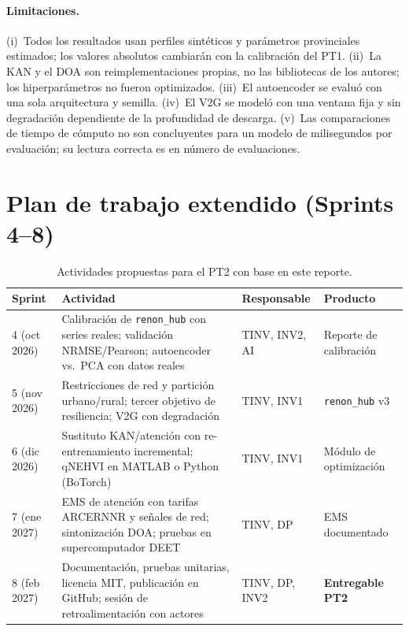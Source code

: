 \documentclass[11pt,a4paper]{article}
\begin{document}
\paragraph{Limitaciones.} (i)~Todos los resultados usan perfiles sint\'eticos y
par\'ametros provinciales estimados; los valores absolutos cambiar\'an con la
calibraci\'on del PT1. (ii)~La KAN y el DOA son reimplementaciones propias, no las
bibliotecas de los autores; los hiperpar\'ametros no fueron optimizados. (iii)~El
autoencoder se evalu\'o con una sola arquitectura y semilla. (iv)~El V2G se model\'o con
una ventana fija y sin degradaci\'on dependiente de la profundidad de descarga.
(v)~Las comparaciones de tiempo de c\'omputo no son concluyentes para un modelo de
milisegundos por evaluaci\'on; su lectura correcta es en n\'umero de evaluaciones.

\section{Plan de trabajo extendido (Sprints 4--8)}
\begin{table}[htbp]
\centering\small
\caption{Actividades propuestas para el PT2 con base en este reporte.}
\label{tab:plan}
\begin{tabular}{p{1.9cm}p{7.2cm}p{2.2cm}p{2.6cm}}
\toprule
\textbf{Sprint} & \textbf{Actividad} & \textbf{Responsable} & \textbf{Producto} \\
\midrule
4 (oct 2026) & Calibraci\'on de \texttt{renon\_hub} con series reales; validaci\'on NRMSE/Pearson; autoencoder vs.\ PCA con datos reales & TINV, INV2, AI & Reporte de calibraci\'on \\
5 (nov 2026) & Restricciones de red y partici\'on urbano/rural; tercer objetivo de resiliencia; V2G con degradaci\'on & TINV, INV1 & \texttt{renon\_hub} v3 \\
6 (dic 2026) & Sustituto KAN/atenci\'on con re-entrenamiento incremental; qNEHVI en MATLAB o Python (BoTorch) & TINV, INV1 & M\'odulo de optimizaci\'on \\
7 (ene 2027) & EMS de atenci\'on con tarifas ARCERNNR y se\~nales de red; sintonizaci\'on DOA; pruebas en supercomputador DEET & TINV, DP & EMS documentado \\
8 (feb 2027) & Documentaci\'on, pruebas unitarias, licencia MIT, publicaci\'on en GitHub; sesi\'on de retroalimentaci\'on con actores & TINV, DP, INV2 & \textbf{Entregable PT2} \\
\bottomrule
\end{tabular}
\end{table}
\end{document}
